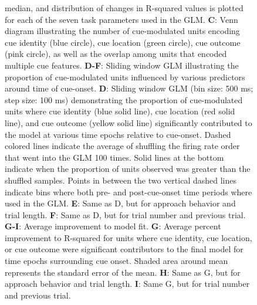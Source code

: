 \documentclass[11pt]{article}
\newcommand{\bsf}[1]{\textbf{#1}}
\begin{document}
\begin{figure}[ht!]
{median, and distribution of changes in R-squared values is plotted for each of
the seven task parameters used in the GLM. \bsf{C}: Venn diagram illustrating the number of cue-modulated units encoding cue identity (blue circle), cue location (green circle), cue outcome (pink circle), as well as the overlap among units that encoded multiple cue features. \bsf{D-F}: Sliding window GLM illustrating the proportion of cue-modulated units influenced by various predictors around time of cue-onset. \bsf{D}: Sliding window GLM (bin size: 500 ms; step size: 100 ms) demonstrating the proportion of cue-modulated units where cue identity (blue solid line), cue location (red solid line), and cue outcome (yellow solid line) significantly contributed to the model at various time epochs relative to cue-onset. Dashed colored lines indicate the average of shuffling the firing rate order that went into the GLM 100 times. Solid lines at the bottom indicate when the proportion of units observed was greater than the shuffled samples. Points in between the two vertical dashed lines indicate bins where both pre- and post-cue-onset time periods where used in the GLM. \bsf{E}: Same as D, but for approach behavior and trial length. \bsf{F}: Same as D, but for trial number and previous trial. \bsf{G-I}: Average improvement to model fit. \bsf{G}: Average percent improvement to R-squared for units where cue identity, cue location, or cue outcome were significant contributors to the final model for time epochs surrounding cue onset. Shaded area around mean represents the standard error of the mean. \bsf{H}: Same as G, but for approach behavior and trial length. \bsf{I}: Same G, but for trial number and previous trial.}
\label{fig:GLM}
\end{figure} \clearpage
\end{document}
